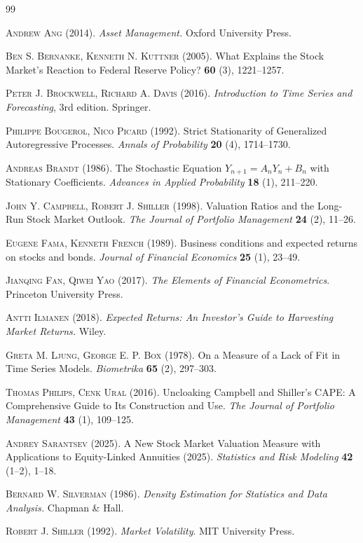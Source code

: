 \documentclass[12pt]{amsart}
\begin{document}
\begin{thebibliography}{99}

 \textsc{Andrew Ang} (2014). \textit{Asset Management.} Oxford University Press.

 \textsc{Ben S. Bernanke, Kenneth N. Kuttner} (2005). What Explains the Stock Market's Reaction to Federal Reserve Policy? \textbf{60} (3), 1221--1257.

 \textsc{Peter J. Brockwell, Richard A. Davis} (2016). \textit{Introduction to Time Series and Forecasting}, 3rd edition. Springer.

 \textsc{Philippe Bougerol, Nico Picard} (1992). Strict Stationarity of Generalized Autoregressive Processes. \textit{Annals of Probability} \textbf{20} (4), 1714--1730.

 \textsc{Andreas Brandt} (1986). The Stochastic Equation $Y_{n+1} = A_nY_n + B_n$ with Stationary Coefficients. \textit{Advances in Applied Probability} \textbf{18} (1), 211--220.

 \textsc{John Y. Campbell, Robert J. Shiller} (1998). Valuation Ratios and the Long-Run Stock Market Outlook. \textit{The Journal of Portfolio Management} \textbf{24} (2), 11--26.

 \textsc{Eugene Fama, Kenneth French} (1989). Business conditions and expected returns on stocks and bonds. \textit{Journal of Financial Economics} \textbf{25} (1),  23--49. 

 \textsc{Jianqing Fan, Qiwei Yao} (2017). \textit{The Elements of Financial Econometrics}. Princeton University Press.

 \textsc{Antti Ilmanen} (2018). \textit{Expected Returns: An Investor's Guide to Harvesting Market Returns.} Wiley. 

 \textsc{Greta M. Ljung, George E. P. Box} (1978). On a Measure of a Lack of Fit in Time Series Models. \textit{Biometrika} \textbf{65} (2), 297--303. 

 \textsc{Thomas Philips, Cenk Ural} (2016). Uncloaking Campbell and Shiller’s CAPE: A Comprehensive Guide to Its Construction and Use. \textit{The Journal of Portfolio Management} \textbf{43} (1), 109--125.

 \textsc{Andrey Sarantsev} (2025). A New Stock Market Valuation Measure with Applications to Equity-Linked Annuities (2025). \textit{Statistics and Risk Modeling} \textbf{42} (1--2), 1--18.

 \textsc{Bernard W. Silverman} (1986). \textit{Density Estimation for Statistics and Data Analysis.} Chapman \& Hall.

 \textsc{Robert J. Shiller} (1992). \textit{Market Volatility}. MIT University Press.
\end{thebibliography}
\end{document}
